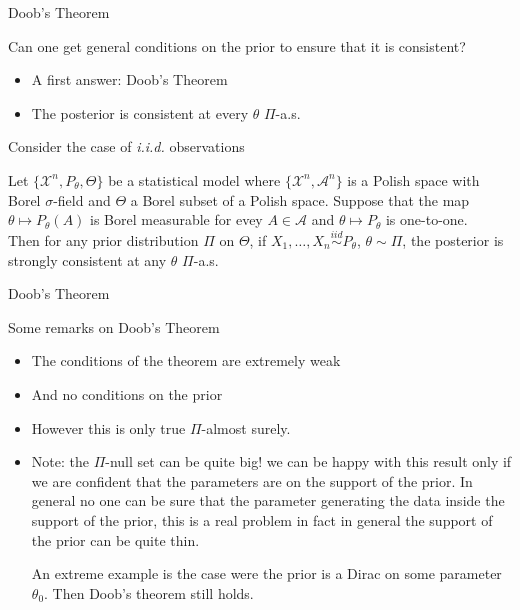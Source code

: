 {Doob's Theorem}

Can one get general conditions on the prior to ensure that it is consistent?  
\begin{itemize}
 \item A first answer: Doob's Theorem
 \item The posterior is consistent at every $\theta$ $\Pi$-a.s. 
 \end{itemize} 
  
 Consider the case of \emph{i.i.d.} observations
 \begin{theorem}
 Let $\{\mathcal{X}^n, P_\theta, \Theta\}$ be a statistical model where $\{\mathcal{X}^n,\mathcal{A}^n\}$ is a Polish space with Borel $\sigma$-field and $\Theta$ a Borel subset of a Polish space. Suppose that the map $\theta \mapsto P_\theta(A)$ is Borel measurable for evey $A\in \mathcal{A}$ and $\theta \mapsto P_\theta$ is one-to-one. \\
 Then for any prior distribution $\Pi$ on $\Theta$, if $X_1, \dots, X_n \overset{iid}{\sim} P_\theta$, $\theta \sim \Pi$, \alert{the posterior is strongly consistent at any $\theta$ $\Pi$-a.s.}
 \end{theorem}






{Doob's Theorem}

\begin{block}{Some remarks on Doob's Theorem}
\begin{itemize}
\item The conditions of the theorem are extremely weak
\item And no conditions on the prior
\item However this is only true \alert{$\Pi$-almost surely}. 
\item Note: the $\Pi$-null set can be quite big! we can be happy with this result only if we are confident that the parameters are on the support of the prior. In general no one can be sure that the parameter generating the data inside the support of the prior, this is a real problem in fact in general the support of the prior can be quite thin. 

An extreme example is the case were the prior is a Dirac on some parameter $\theta_0$. Then Doob's theorem still holds. 

\end{itemize}
\end{block}




